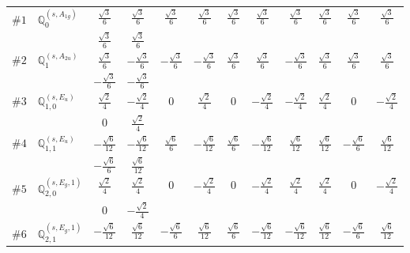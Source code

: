 \documentclass[fleqn,9pt,landscape]{jsarticle}
\begin{document}
\begin{center}
\begin{longtable}{lcccccccccc}
$ \#1\quad \mathbb{Q}_{0}^{(s,A_{1g})} $ & $ \frac{\sqrt{3}}{6} $ & $ \frac{\sqrt{3}}{6} $ & $ \frac{\sqrt{3}}{6} $ & $ \frac{\sqrt{3}}{6} $ & $ \frac{\sqrt{3}}{6} $ & $ \frac{\sqrt{3}}{6} $ & $ \frac{\sqrt{3}}{6} $ & $ \frac{\sqrt{3}}{6} $ & $ \frac{\sqrt{3}}{6} $ & $ \frac{\sqrt{3}}{6} $ \\
& $ \frac{\sqrt{3}}{6} $ & $ \frac{\sqrt{3}}{6} $ & $  $ & $  $ & $  $ & $  $ & $  $ & $  $ & $  $ & $  $ \\ \hline
$ \#2\quad \mathbb{Q}_{1}^{(s,A_{2u})} $ & $ \frac{\sqrt{3}}{6} $ & $ - \frac{\sqrt{3}}{6} $ & $ - \frac{\sqrt{3}}{6} $ & $ - \frac{\sqrt{3}}{6} $ & $ \frac{\sqrt{3}}{6} $ & $ \frac{\sqrt{3}}{6} $ & $ - \frac{\sqrt{3}}{6} $ & $ \frac{\sqrt{3}}{6} $ & $ \frac{\sqrt{3}}{6} $ & $ \frac{\sqrt{3}}{6} $ \\
& $ - \frac{\sqrt{3}}{6} $ & $ - \frac{\sqrt{3}}{6} $ & $  $ & $  $ & $  $ & $  $ & $  $ & $  $ & $  $ & $  $ \\ \hline
$ \#3\quad \mathbb{Q}_{1,0}^{(s,E_{u})} $ & $ \frac{\sqrt{2}}{4} $ & $ - \frac{\sqrt{2}}{4} $ & $ 0 $ & $ \frac{\sqrt{2}}{4} $ & $ 0 $ & $ - \frac{\sqrt{2}}{4} $ & $ - \frac{\sqrt{2}}{4} $ & $ \frac{\sqrt{2}}{4} $ & $ 0 $ & $ - \frac{\sqrt{2}}{4} $ \\
& $ 0 $ & $ \frac{\sqrt{2}}{4} $ & $  $ & $  $ & $  $ & $  $ & $  $ & $  $ & $  $ & $  $ \\ \hline
$ \#4\quad \mathbb{Q}_{1,1}^{(s,E_{u})} $ & $ - \frac{\sqrt{6}}{12} $ & $ - \frac{\sqrt{6}}{12} $ & $ \frac{\sqrt{6}}{6} $ & $ - \frac{\sqrt{6}}{12} $ & $ \frac{\sqrt{6}}{6} $ & $ - \frac{\sqrt{6}}{12} $ & $ \frac{\sqrt{6}}{12} $ & $ \frac{\sqrt{6}}{12} $ & $ - \frac{\sqrt{6}}{6} $ & $ \frac{\sqrt{6}}{12} $ \\
& $ - \frac{\sqrt{6}}{6} $ & $ \frac{\sqrt{6}}{12} $ & $  $ & $  $ & $  $ & $  $ & $  $ & $  $ & $  $ & $  $ \\ \hline
$ \#5\quad \mathbb{Q}_{2,0}^{(s,E_{g},1)} $ & $ \frac{\sqrt{2}}{4} $ & $ \frac{\sqrt{2}}{4} $ & $ 0 $ & $ - \frac{\sqrt{2}}{4} $ & $ 0 $ & $ - \frac{\sqrt{2}}{4} $ & $ \frac{\sqrt{2}}{4} $ & $ \frac{\sqrt{2}}{4} $ & $ 0 $ & $ - \frac{\sqrt{2}}{4} $ \\
& $ 0 $ & $ - \frac{\sqrt{2}}{4} $ & $  $ & $  $ & $  $ & $  $ & $  $ & $  $ & $  $ & $  $ \\ \hline
$ \#6\quad \mathbb{Q}_{2,1}^{(s,E_{g},1)} $ & $ - \frac{\sqrt{6}}{12} $ & $ \frac{\sqrt{6}}{12} $ & $ - \frac{\sqrt{6}}{6} $ & $ \frac{\sqrt{6}}{12} $ & $ \frac{\sqrt{6}}{6} $ & $ - \frac{\sqrt{6}}{12} $ & $ - \frac{\sqrt{6}}{12} $ & $ \frac{\sqrt{6}}{12} $ & $ - \frac{\sqrt{6}}{6} $ & $ \frac{\sqrt{6}}{12} $ \\

\end{longtable}
\end{center}
\end{document}
